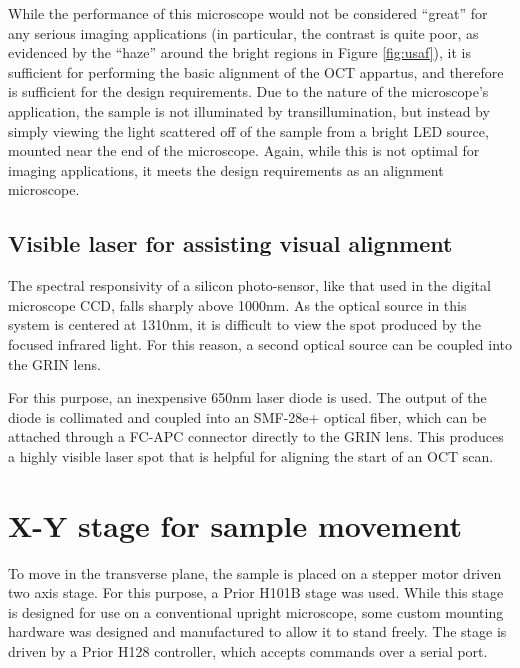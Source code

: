 While the performance of this microscope would not be considered ``great'' for any serious imaging applications (in particular, the contrast is quite poor, as evidenced by the ``haze'' around the bright regions in Figure \ref{fig:usaf}), it is sufficient for performing the basic alignment of the OCT appartus, and therefore is sufficient for the design requirements. Due to the nature of the microscope's application, the sample is not illuminated by transillumination, but instead by simply viewing the light scattered off of the sample from a bright LED source, mounted near the end of the microscope. Again, while this is not optimal for imaging applications, it meets the design requirements as an alignment microscope.

\subsection{Visible laser for assisting visual alignment}


The spectral responsivity of a silicon photo-sensor, like that used in the digital microscope CCD, falls sharply above 1000nm. As the optical source in this system is centered at 1310nm, it is difficult to view the spot produced by the focused infrared light. For this reason, a second optical source can be coupled into the GRIN lens.

For this purpose, an inexpensive 650nm laser diode is used. The output of the diode is collimated and coupled into an SMF-28e+ optical fiber, which can be attached through a FC-APC connector directly to the GRIN lens. This produces a highly visible laser spot that is helpful for aligning the start of an OCT scan.


\section{X-Y stage for sample movement}

To move in the transverse plane, the sample is placed on a stepper motor driven two axis stage. For this purpose, a Prior H101B stage was used. While this stage is designed for use on a conventional upright microscope, some custom mounting hardware was designed and manufactured to allow it to stand freely. The stage is driven by a Prior H128 controller, which accepts commands over a serial port.

